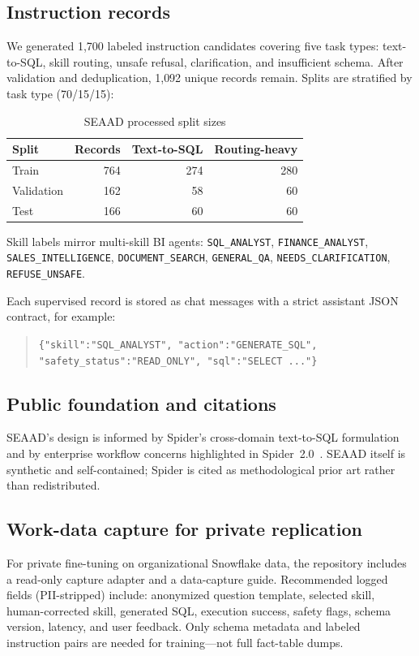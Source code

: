\documentclass[conference]{IEEEtran}
\begin{document}
\subsection{Instruction records}
We generated 1{,}700 labeled instruction candidates covering five task types: text-to-SQL, skill routing, unsafe refusal, clarification, and insufficient schema. After validation and deduplication, 1{,}092 unique records remain. Splits are stratified by task type (70/15/15):
\begin{table}[tbp]
\centering
\caption{SEAAD processed split sizes}
\label{tab:splits}
\begin{tabular}{lrrr}
\toprule
Split & Records & Text-to-SQL & Routing-heavy \\
\midrule
Train & 764 & 274 & 280 \\
Validation & 162 & 58 & 60 \\
Test & 166 & 60 & 60 \\
\bottomrule
\end{tabular}
\end{table}
{\raggedright Skill labels mirror multi-skill BI agents:
\texttt{SQL\_ANALYST}, \texttt{FINANCE\_ANALYST}, \texttt{SALES\_INTELLIGENCE}, \texttt{DOCUMENT\_SEARCH}, \texttt{GENERAL\_QA}, \texttt{NEEDS\_CLARIFICATION}, \texttt{REFUSE\_UNSAFE}.\par}
Each supervised record is stored as chat messages with a strict assistant JSON contract, for example:
\begin{quote}\raggedright
\small\texttt{\{"skill":"SQL\_ANALYST", "action":"GENERATE\_SQL",}\\
\texttt{"safety\_status":"READ\_ONLY", "sql":"SELECT ..."\}}
\end{quote}
\subsection{Public foundation and citations}
SEAAD's design is informed by Spider's cross-domain text-to-SQL formulation~\cite{yu2018spider} and by enterprise workflow concerns highlighted in Spider~2.0~\cite{lei2025spider2}. SEAAD itself is synthetic and self-contained; Spider is cited as methodological prior art rather than redistributed.
\subsection{Work-data capture for private replication}
For private fine-tuning on organizational Snowflake data, the repository includes a read-only capture adapter and a data-capture guide. Recommended logged fields (PII-stripped) include: anonymized question template, selected skill, human-corrected skill, generated SQL, execution success, safety flags, schema version, latency, and user feedback. Only schema metadata and labeled instruction pairs are needed for training---not full fact-table dumps.
\end{document}
